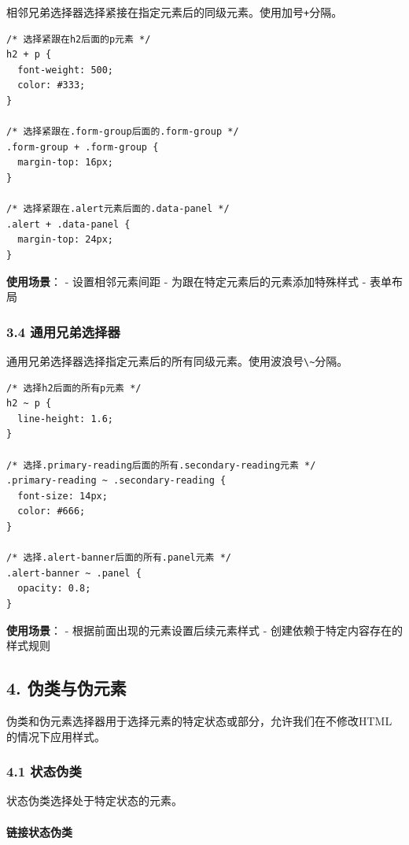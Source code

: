 相邻兄弟选择器选择紧接在指定元素后的同级元素。使用加号\passthrough{\lstinline!+!}分隔。

\begin{lstlisting}
/* 选择紧跟在h2后面的p元素 */
h2 + p {
  font-weight: 500;
  color: #333;
}

/* 选择紧跟在.form-group后面的.form-group */
.form-group + .form-group {
  margin-top: 16px;
}

/* 选择紧跟在.alert元素后面的.data-panel */
.alert + .data-panel {
  margin-top: 24px;
}
\end{lstlisting}

\textbf{使用场景}： - 设置相邻元素间距 -
为跟在特定元素后的元素添加特殊样式 - 表单布局

\subsubsection{3.4
通用兄弟选择器}\label{ux901aux7528ux5144ux5f1fux9009ux62e9ux5668}

通用兄弟选择器选择指定元素后的所有同级元素。使用波浪号\passthrough{\lstinline!\~!}分隔。

\begin{lstlisting}
/* 选择h2后面的所有p元素 */
h2 ~ p {
  line-height: 1.6;
}

/* 选择.primary-reading后面的所有.secondary-reading元素 */
.primary-reading ~ .secondary-reading {
  font-size: 14px;
  color: #666;
}

/* 选择.alert-banner后面的所有.panel元素 */
.alert-banner ~ .panel {
  opacity: 0.8;
}
\end{lstlisting}

\textbf{使用场景}： - 根据前面出现的元素设置后续元素样式 -
创建依赖于特定内容存在的样式规则

\subsection{4. 伪类与伪元素}\label{ux4f2aux7c7bux4e0eux4f2aux5143ux7d20}

伪类和伪元素选择器用于选择元素的特定状态或部分，允许我们在不修改HTML的情况下应用样式。

\subsubsection{4.1 状态伪类}\label{ux72b6ux6001ux4f2aux7c7b}

状态伪类选择处于特定状态的元素。

\paragraph{链接状态伪类}\label{ux94feux63a5ux72b6ux6001ux4f2aux7c7b}

